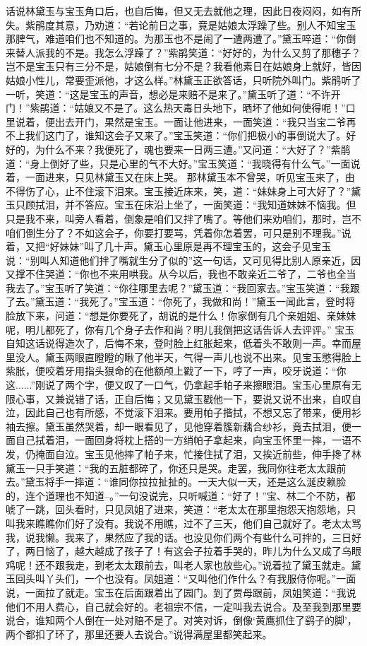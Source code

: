 \documentclass[12pt,oneside]{book}
\begin{document}
话说林黛玉与宝玉角口后，也自后悔，但又无去就他之理，因此日夜闷闷，如有所失。紫鹃度其意，乃劝道：“若论前日之事，竟是姑娘太浮躁了些。别人不知宝玉那脾气，难道咱们也不知道的。为那玉也不是闹了一遭两遭了。”黛玉啐道：“你倒来替人派我的不是。我怎么浮躁了？”紫鹃笑道：“好好的，为什么又剪了那穗子？岂不是宝玉只有三分不是，姑娘倒有七分不是？我看他素日在姑娘身上就好，皆因姑娘小性儿，常要歪派他，才这么样。”林黛玉正欲答话，只听院外叫门。紫鹃听了一听，笑道：“这是宝玉的声音，想必是来赔不是来了。”黛玉听了道：“不许开门！”紫鹃道：“姑娘又不是了。这么热天毒日头地下，晒坏了他如何使得呢！”口里说着，便出去开门，果然是宝玉。一面让他进来，一面笑道：“我只当宝二爷再不上我们这门了，谁知这会子又来了。”宝玉笑道：“你们把极小的事倒说大了。好好的，为什么不来？我便死了，魂也要来一日两三遭。”又问道：“大好了？”紫鹃道：“身上倒好了些，只是心里的气不大好。”宝玉笑道：“我晓得有什么气。”一面说着，一面进来，只见林黛玉又在床上哭。
那林黛玉本不曾哭，听见宝玉来了，由不得伤了心，止不住滚下泪来。宝玉接近床来，笑，道：“妹妹身上可大好了？”黛玉只顾拭泪，并不答应。宝玉在床沿上坐了，一面笑道：“我知道妹妹不恼我。但只是我不来，叫旁人看着，倒象是咱们又拌了嘴了。等他们来劝咱们，那时，岂不咱们倒生分了？不如这会子，你要打要骂，凭着你怎着罢，可只是别不理我。”说着，又把“好妹妹”叫了几十声。黛玉心里原是再不理宝玉的，这会子见宝玉说：“别叫人知道他们拌了嘴就生分了似的”这一句话，又可见得比别人原亲近，因又撑不住哭道：“你也不来用哄我。从今以后，我也不敢亲近二爷了，二爷也全当我去了。”宝玉听了笑道：“你往哪里去呢？”黛玉道：“我回家去。”宝玉笑道：“我跟了去。”黛玉道：“我死了。”宝玉道：“你死了，我做和尚！”黛玉一闻此言，登时将脸放下来，问道：“想是你要死了，胡说的是什么！你家倒有几个亲姐姐、亲妹妹呢，明儿都死了，你有几个身子去作和尚？明儿我倒把这话告诉人去评评。”
宝玉自知这话说得造次了，后悔不来，登时脸上红胀起来，低着头不敢则一声。幸而屋里没人。黛玉两眼直瞪瞪的瞅了他半天，气得一声儿也说不出来。见宝玉憋得脸上紫胀，便咬着牙用指头狠命的在他额颅上戳了一下，哼了一声，咬牙说道：“你这......”刚说了两个字，便又叹了一口气，仍拿起手帕子来擦眼泪。宝玉心里原有无限心事，又兼说错了话，正自后悔；又见黛玉戳他一下，要说又说不出来，自叹自泣，因此自己也有所感，不觉滚下泪来。要用帕子揩拭，不想又忘了带来，便用衫袖去擦。黛玉虽然哭着，却一眼看见了，见他穿着簇新藕合纱衫，竟去拭泪，便一面自己拭着泪，一面回身将枕上搭的一方绡帕子拿起来，向宝玉怀里一摔，一语不发，仍掩面自泣。宝玉见他摔了帕子来，忙接住拭了泪，又挨近前些，伸手搀了林黛玉一只手笑道：“我的五脏都碎了，你还只是哭。走罢，我同你往老太太跟前去。”黛玉将手一摔道：“谁同你拉拉扯扯的。一天大似一天，还是这么涎皮赖脸的，连个道理也不知道--。”一句没说完，只听喊道：“好了！”宝、林二个不防，都唬了一跳，回头看时，只见凤姐了进来，笑道：“老太太在那里抱怨天抱怨地，只叫我来瞧瞧你们好了没有。我说不用瞧，过不了三天，他们自己就好了。老太太骂我，说我懒。我来了，果然应了我的话。也没见你们两个有些什么可拌的，三日好了，两日恼了，越大越成了孩子了！有这会子拉着手哭的，昨儿为什么又成了乌眼鸡呢！还不跟我走，到老太太跟前去，叫老人家也放些心。”说着拉了黛玉就走。黛玉回头叫丫头们，一个也没有。凤姐道：“又叫他们作什么？有我服侍你呢。”一面说，一面拉了就走。宝玉在后面跟着出了园门。到了贾母跟前，凤姐笑道：“我说他们不用人费心，自己就会好的。老祖宗不信，一定叫我去说合。及至我到那里要说合，谁知两个人倒在一处对赔不是了。对笑对诉，倒像‘黄鹰抓住了鹞子的脚’，两个都扣了环了，那里还要人去说合。”说得满屋里都笑起来。
\end{document}
